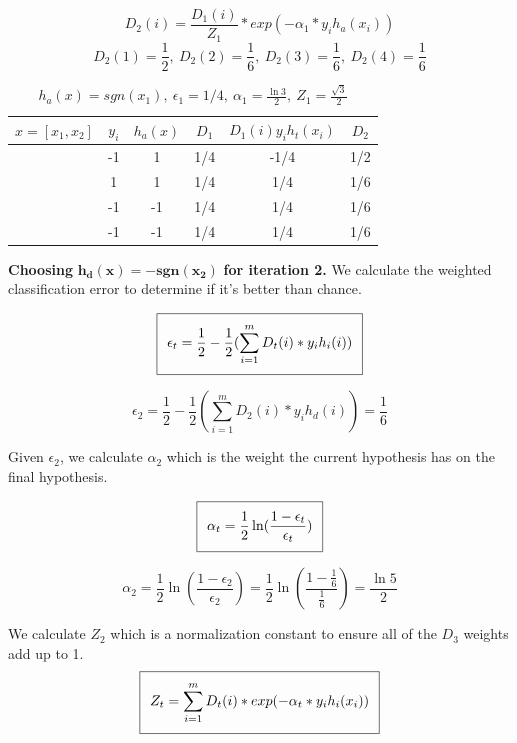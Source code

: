 \documentclass[11pt]{article}
\begin{document}
$$D_{2}(i) = \frac{D_1(i)}{Z_1} * exp(-\alpha_1 * y_ih_a(x_i))$$
$$D_2(1) = \frac{1}{2}, \ D_2(2) = \frac{1}{6}, \ D_2(3) = \frac{1}{6}, \ D_2(4) = \frac{1}{6} $$


 \begin{table}[H]
\centering
{\renewcommand{\arraystretch}{1.2}%
\begin{tabular}{| c | c | c | c | c | c |}
\hline
$x = [x_1, x_2]$& $y_i$ & $h_a(x)$ & $D_1$ & $D_1(i)y_ih_t(x_i)$ & $D_2$\\
\hline
[1,1] & -1 & 1 & 1/4 & -1/4 & 1/2\\ \hline
[1,-1] & 1 & 1 & 1/4 & 1/4 & 1/6\\ \hline
[-1,-1] & -1 & -1 & 1/4 & 1/4 & 1/6\\ \hline
[-1,1] & -1 & -1 & 1/4 & 1/4 & 1/6\\ \hline
\end{tabular}}
\caption{$h_a(x) = sgn(x_1), \ \epsilon_1 = 1/4, \ \alpha_1 = \frac{\ln3}{2}, \ Z_1 = \frac{\sqrt{3}}{2}$}
\end{table}

\textbf{Choosing} $\mathbf{h_d(x) = -sgn(x_2)}$ \textbf{for iteration 2.} We calculate the weighted classification error to determine if it's better than chance.

\begin{equation}
\setlength\fboxsep{0.25cm}
\setlength\fboxrule{0.4pt}
\boxed{\epsilon_t = \frac{1}{2} - \frac{1}{2}(\sum_{i=1}^m D_t(i)*y_ih_i(i))}
\end{equation}

$$\epsilon_2 = \frac{1}{2} - \frac{1}{2}(\sum_{i=1}^m D_2(i)*y_ih_d(i)) = \frac{1}{6}$$

Given $\epsilon_2$, we calculate $\alpha_2$ which is the weight the current hypothesis has on the final hypothesis.

\begin{equation}
\setlength\fboxsep{0.25cm}
\setlength\fboxrule{0.4pt}
\boxed{\alpha_t = \frac{1}{2}\ln(\frac{1 - \epsilon_t}{\epsilon_t})}
\end{equation}

$$\alpha_2 = \frac{1}{2}\ln(\frac{1 - \epsilon_2}{\epsilon_2}) = \frac{1}{2}\ln(\frac{1 - \frac{1}{6}}{\frac{1}{6}}) = \frac{\ln5}{2}$$

We calculate $Z_2$ which is a normalization constant to ensure all of the $D_3$ weights add up to 1.
\begin{equation}
\setlength\fboxsep{0.25cm}
\setlength\fboxrule{0.4pt}
\boxed{Z_t = \sum_{i = 1}^m D_t(i) * exp(-\alpha_t * y_ih_i(x_i))}
\end{equation}
\end{document}
